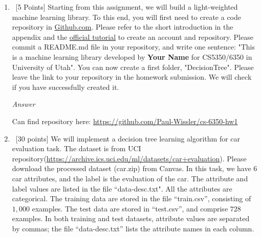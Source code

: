 \documentclass[12pt, fullpage,letterpaper]{article}
\begin{document}
\begin{enumerate}
	\item~[5 Points] Starting from this assignment, we will build a light-weighted machine learning library. 
To this end, you will first need to create a code repository in \href{https://github.com/}{Github.com}. Please refer to the short introduction in the appendix and the \href{https://guides.github.com/activities/hello-world/}{official tutorial} to create an account and repository. Please commit a README.md file in your repository, and write one sentence: "This is a machine learning library developed by \textbf{Your Name} for CS5350/6350 in University of Utah".  You can now create a first folder, "DecisionTree". Please leave the link to your repository in the homework submission. We will check if you have successfully created it. 

\emph{Answer}

Can find repository here: \url{https://github.com/Paul-Wissler/cs-6350-hw1}

\item~[30 points] We will implement a decision tree learning algorithm for car evaluation task. The dataset is from UCI repository(\url{https://archive.ics.uci.edu/ml/datasets/car+evaluation}). Please download the processed dataset (car.zip) from Canvas.  In this task, we have $6$ car attributes, and the label is the evaluation of the car. The attribute and label values are listed in the file ``data-desc.txt". All the attributes are categorical.  The training data are stored in the file ``train.csv'', consisting of $1,000$ examples. The test data are stored in ``test.csv'', and comprise $728$ examples. In both training and test datasets, attribute values are separated by commas; the file ``data-desc.txt''  lists the attribute names in each column. 
\\


\end{enumerate}
\end{document}
